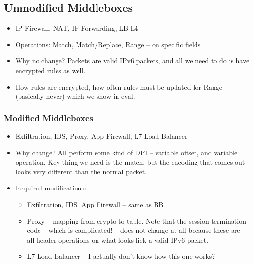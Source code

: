 \subsection{Unmodified Middleboxes}
\begin{itemize}
  \item IP Firewall, NAT, IP Forwarding, LB L4
  \item Operations: Match, Match/Replace, Range -- on specific fields
  \item Why no change? Packets are valid IPv6 packets, and all we need to do is have encrypted rules as well.
  \item How rules are encrypted, how often rules must be updated for Range (basically never) which we show in eval.
\end{itemize}

\subsubsection{Modified Middleboxes}
\begin{itemize}
  \item Exfiltration, IDS, Proxy, App Firewall, L7 Load Balancer
  \item Why change? All perform some kind of DPI -- variable offset, and variable operation. Key thing we need is the match, but the encoding that comes out looks very different than the normal packet.
  \item Required modifications:
    \begin{itemize}
      \item Exfiltration, IDS, App Firewall -- same as BB
      \item Proxy -- mapping from crypto to table. Note that the session termination code -- which is complicated! -- does not change at all because these are all header operations on what looks liek a valid IPv6 packet.
      \item L7 Load Balancer -- I actually don't know how this one works?
    \end{itemize}
\end{itemize}
